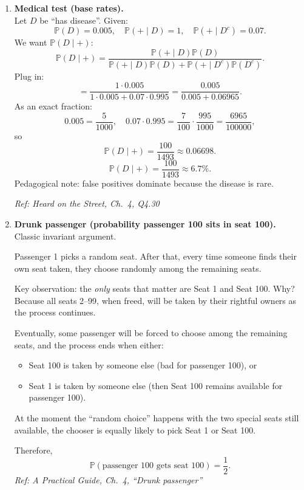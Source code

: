 \documentclass[11pt]{article}
\begin{document}
\begin{enumerate}[label=\textbf{\arabic*.}, resume]
\hfill{\small\textit{Ref: Heard on the Street, Ch.\ 4, Q4.22}}

\item \textbf{Medical test (base rates).}\\
Let $D$ be ``has disease''. Given:
\[
\mathbb{P}(D)=0.005,\quad
\mathbb{P}(+\mid D)=1,\quad
\mathbb{P}(+\mid D^c)=0.07.
\]
We want $\mathbb{P}(D\mid +)$:
\[
\mathbb{P}(D\mid +)=\frac{\mathbb{P}(+\mid D)\mathbb{P}(D)}{\mathbb{P}(+\mid D)\mathbb{P}(D)+\mathbb{P}(+\mid D^c)\mathbb{P}(D^c)}.
\]
Plug in:
\[
=\frac{1\cdot 0.005}{1\cdot 0.005 + 0.07\cdot 0.995}
=\frac{0.005}{0.005+0.06965}.
\]
As an exact fraction:
\[
0.005=\frac{5}{1000},\quad 0.07\cdot 0.995=\frac{7}{100}\cdot\frac{995}{1000}=\frac{6965}{100000},
\]
so
\[
\mathbb{P}(D\mid +)=\frac{100}{1493}\approx 0.06698.
\]
\[
\boxed{\mathbb{P}(D\mid +)=\frac{100}{1493}\approx 6.7\%.}
\]
Pedagogical note: false positives dominate because the disease is rare.

\hfill{\small\textit{Ref: Heard on the Street, Ch.\ 4, Q4.30}}

\item \textbf{Drunk passenger (probability passenger 100 sits in seat 100).}\\
Classic invariant argument.

Passenger 1 picks a random seat. After that, every time someone finds their own seat taken, they choose randomly among the remaining seats.

Key observation: the \emph{only} seats that matter are Seat 1 and Seat 100.
Why? Because all seats 2--99, when freed, will be taken by their rightful owners as the process continues.

Eventually, some passenger will be forced to choose among the remaining seats, and the process ends when either:
\begin{itemize}
\item Seat 100 is taken by someone else (bad for passenger 100), or
\item Seat 1 is taken by someone else (then Seat 100 remains available for passenger 100).
\end{itemize}

At the moment the ``random choice'' happens with the two special seats still available, the chooser is equally likely to pick Seat 1 or Seat 100.

Therefore,
\[
\boxed{\mathbb{P}(\text{passenger 100 gets seat 100})=\frac12.}
\]
\hfill{\small\textit{Ref: A Practical Guide, Ch.\ 4, ``Drunk passenger''}}


\end{enumerate}
\end{document}
